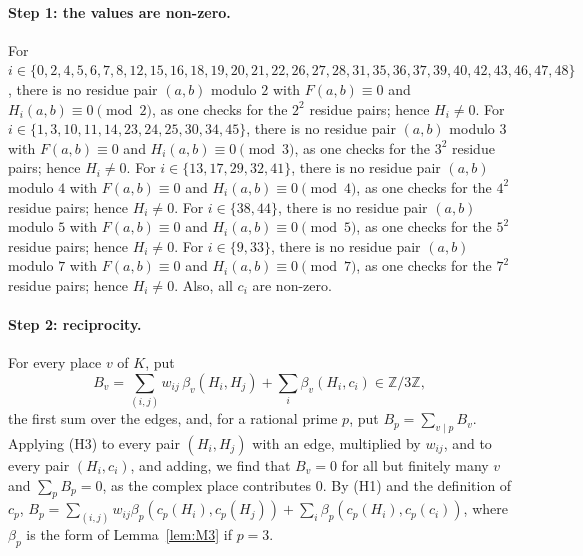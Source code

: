\documentclass[11pt]{article}
\newcommand{\Z}{\mathbb{Z}}
\begin{document}
\paragraph{Step 1: the values are non-zero.} For $i\in\{0,\allowbreak 2,\allowbreak 4,\allowbreak 5,\allowbreak 6,\allowbreak 7,\allowbreak 8,\allowbreak 12,\allowbreak 15,\allowbreak 16,\allowbreak 18,\allowbreak 19,\allowbreak 20,\allowbreak 21,\allowbreak 22,\allowbreak 26,\allowbreak 27,\allowbreak 28,\allowbreak 31,\allowbreak 35,\allowbreak 36,\allowbreak 37,\allowbreak 39,\allowbreak 40,\allowbreak 42,\allowbreak 43,\allowbreak 46,\allowbreak 47,\allowbreak 48\}$, there is no residue pair $(a,b)$ modulo $2$ with $F(a,b)\equiv0$ and $H_i(a,b)\equiv0\pmod{2}$, as one checks for the $2^2$ residue pairs; hence $H_i\neq0$. For $i\in\{1,\allowbreak 3,\allowbreak 10,\allowbreak 11,\allowbreak 14,\allowbreak 23,\allowbreak 24,\allowbreak 25,\allowbreak 30,\allowbreak 34,\allowbreak 45\}$, there is no residue pair $(a,b)$ modulo $3$ with $F(a,b)\equiv0$ and $H_i(a,b)\equiv0\pmod{3}$, as one checks for the $3^2$ residue pairs; hence $H_i\neq0$. For $i\in\{13,\allowbreak 17,\allowbreak 29,\allowbreak 32,\allowbreak 41\}$, there is no residue pair $(a,b)$ modulo $4$ with $F(a,b)\equiv0$ and $H_i(a,b)\equiv0\pmod{4}$, as one checks for the $4^2$ residue pairs; hence $H_i\neq0$. For $i\in\{38,\allowbreak 44\}$, there is no residue pair $(a,b)$ modulo $5$ with $F(a,b)\equiv0$ and $H_i(a,b)\equiv0\pmod{5}$, as one checks for the $5^2$ residue pairs; hence $H_i\neq0$. For $i\in\{9,\allowbreak 33\}$, there is no residue pair $(a,b)$ modulo $7$ with $F(a,b)\equiv0$ and $H_i(a,b)\equiv0\pmod{7}$, as one checks for the $7^2$ residue pairs; hence $H_i\neq0$. Also, all $c_i$ are non-zero.

\paragraph{Step 2: reciprocity.} For every place $v$ of $K$, put
\begin{equation}\label{eq:B}
B_v=\sum_{(i,j)}w_{ij}\,\beta_v(H_i,H_j)+\sum_i\beta_v(H_i,c_i)\in\Z/3\Z,
\end{equation}
the first sum over the edges, and, for a rational prime $p$, put $B_p=\sum_{v\mid p}B_v$. Applying (H3) to every pair $(H_i,H_j)$ with an edge, multiplied by $w_{ij}$, and to every pair $(H_i,c_i)$, and adding, we find that $B_v=0$ for all but finitely many $v$ and $\sum_pB_p=0$, as the complex place contributes $0$. By (H1) and the definition of $c_p$, $B_p=\sum_{(i,j)}w_{ij}\beta_p(c_p(H_i),c_p(H_j))+\sum_i\beta_p(c_p(H_i),c_p(c_i))$, where $\beta_p$ is the form of Lemma~\ref{lem:M3} if $p=3$.
\end{document}
